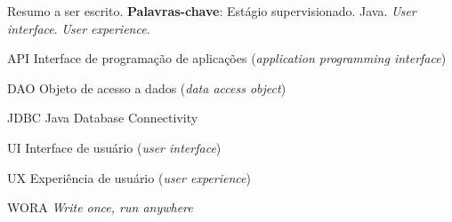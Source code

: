 \imprimircapa
\imprimirfolhaderosto*






\begin{resumo}
	Resumo a ser escrito.
	\textbf{Palavras-chave}: Estágio supervisionado. Java. \textit{User interface}. \textit{User experience}.
\end{resumo}




\begin{siglas}
	\item[API] Interface de programação de aplicações (\textit{application programming interface})
	\item[DAO] Objeto de acesso a dados (\textit{data access object})
	\item[JDBC] Java Database Connectivity
	\item[UI] Interface de usuário (\textit{user interface})
 	\item[UX] Experiência de usuário (\textit{user experience})
	\item[WORA] \textit{Write once, run anywhere}
\end{siglas}

\tableofcontents*
